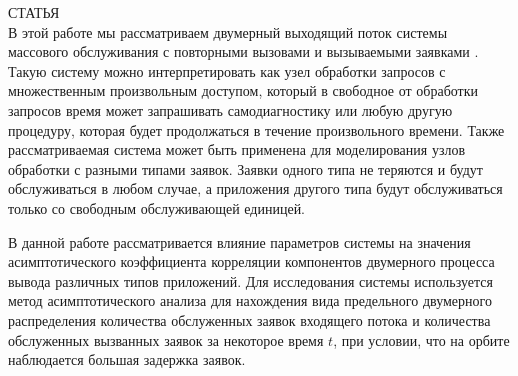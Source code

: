 СТАТЬЯ\\
В этой работе мы рассматриваем двумерный выходящий поток системы массового обслуживания \cite{kendall1953stochastic, lapatin2019asymptotic} с повторными вызовами \cite {jesus2008retrial} и вызываемыми заявками \cite {kulkarni1983queueing}. Такую систему можно интерпретировать как узел обработки запросов с множественным произвольным доступом, который в свободное от обработки запросов время может запрашивать самодиагностику или любую другую процедуру, которая будет продолжаться в течение произвольного времени. Также рассматриваемая система может быть применена для моделирования узлов обработки с разными типами заявок. Заявки одного типа не теряются и будут обслуживаться в любом случае, а приложения другого типа будут обслуживаться только со свободным обслуживающей единицей.


В данной работе рассматривается влияние параметров системы на значения асимптотического коэффициента корреляции компонентов двумерного процесса вывода различных типов приложений. Для исследования системы используется метод асимптотического анализа для нахождения вида предельного двумерного распределения количества обслуженных заявок входящего потока и количества обслуженных вызванных заявок за некоторое время $t$, при условии, что на орбите \cite{nazarov2017asymptotic} наблюдается большая задержка заявок.


 \clearpage